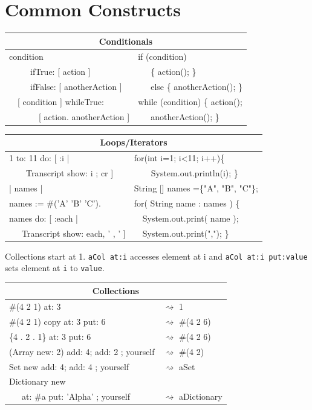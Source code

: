 \documentclass[notumble]{leaflet}
\newcommand{\ct}[1]{{\textsf{#1}}\xspace}
\newcommand{\code}[1]{\foreignlanguage{english}{\texttt{#1}}}
\begin{document}
\vspace{-0.3cm}
\section{Common Constructs}

\noindent
\begin{tabularx}{\linewidth}{@{}lX@{}}
        \toprule
        \multicolumn{2}{c}{\textbf{Conditionals}}\\
        \midrule
        
condition&if (condition) \\
\ \ \ \ \    ifTrue: [ action ] &      \ \ \   \{ action(); \} \\
\ \ \ \ \  ifFalse: [ anotherAction ]&   \ \ \     else \{ anotherAction(); \}\\
\midrule
\ \  [ condition ] whileTrue:&while (condition) \{ action();\\
\ \ \ \ \ \ \  [ action. anotherAction ]&\ \ \     anotherAction(); \}\\
\end{tabularx}

\noindent
\begin{tabularx}{\linewidth}{@{}lX@{}}
        \toprule
        \multicolumn{2}{c}{\textbf{Loops/Iterators}}\\
\midrule
1 to: 11 do: [ :i | &for(int i=1; i<11; i++)\{ \\
\ \ \ \ Transcript show: i ; cr ]&\ \ \ \    System.out.println(i); \}\\
  \midrule
| names | &String [] names =\{"A", "B", "C"\};\\  
names := \#('A' 'B' 'C').&for( String name : names ) \{\\
names do: [ :each |&\ \      System.out.print( name );\\
 \ \ \ Transcript show: each, ' , ' ]&\ \     System.out.print(","); \} \\
\midrule
\end{tabularx}

Collections start at 1. \code{aCol~at:i} accesses element at \ct{i} and \code{aCol at:i put:value} sets element at \code{i} to \code{value}.

\noindent
\begin{tabularx}{\linewidth}{@{}lX@{}}
     \toprule
      \multicolumn{2}{c}{\textbf{Collections}}\\
      \midrule
    \#(4 2 1) at: 3& $\rightsquigarrow$ 1 \\
   \#(4 2 1) copy at: 3 put: 6& $\rightsquigarrow$ \#(4 2 6) \\
   \{4 . 2 . 1\} at: 3 put: 6& $\rightsquigarrow$ \#(4 2 6) \\
     \midrule
    (Array new: 2) add: 4; add: 2 ; yourself& $\rightsquigarrow$ \#(4 2) \\
    Set new add: 4; add: 4 ; yourself&$\rightsquigarrow$ aSet \\
    Dictionary new& \\
    \ \ \ at: \#a put: 'Alpha' ; yourself&$\rightsquigarrow$ aDictionary\\
     \midrule
\end{tabularx}
\end{document}
